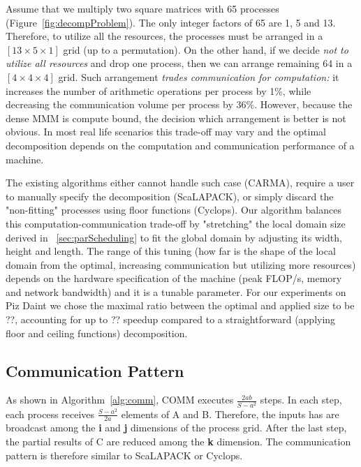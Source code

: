 \documentclass[sigplan,review,anonymous]{acmart}\settopmatter{printfolios=true,printccs=false,printacmref=false}
\begin{document}
Assume that we multiply two square matrices with 65 
processes (Figure~\ref{fig:decompProblem}). The only integer factors 
of 65 are 1, 5 and 13. Therefore, to 
utilize all the resources, the processes must be arranged in a $[13 
\times 5 \times 1]$ grid (up to a permutation). On the other hand, if 
we decide \emph{not to utilize all resources} 
and drop one process, then we can arrange remaining 64 in a $[4 
\times 4 \times 4]$ grid. Such arrangement \emph{trades communication 
	for computation:} it increases the number of arithmetic operations 
per process by 1\%, while decreasing the communication volume per 
process by 36\%. However, because the dense MMM is compute bound, the 
decision which arrangement is better is not obvious.
In most real life scenarios this trade-off may vary and the optimal 
decomposition depends on the computation and communication 
performance 
of a 
machine. 



The existing algorithms either cannot handle such case (CARMA), 
require a user to manually specify the decomposition (ScaLAPACK), or 
simply discard the "non-fitting" processes using floor functions 
(Cyclops). Our algorithm balances this computation-communication 
trade-off by "stretching" the local domain size 
derived in ~\cref{sec:parScheduling} to fit the global 
domain by adjusting its width, height and length. The range of this 
tuning (how far is the shape of the local domain from the optimal, 
increasing communication but utilizing more resources) 
depends on the hardware specification of the 
machine (peak FLOP/s, memory and network bandwidth) and it is a
tunable parameter. For our 
experiments on Piz Daint we chose the maximal ratio between the 
optimal and applied size to be ??, accounting for up to ?? speedup 
compared to a straightforward (applying floor and ceiling functions) 
decomposition.

\subsection{Communication Pattern}
\label{sec:commPattern}
As shown in Algorithm~\ref{alg:comm}, COMM executes $\frac{2ab}{S - a^2}$ 
steps. In each step, each process receives $\frac{S - a^2}{2a}$ elements of A 
and 
B. Therefore, the inputs has are broadcast among the \textbf{i} and \textbf{j} 
dimensions of the process grid. After the last step, the partial results of C 
are reduced among the \textbf{k} dimension. The communication pattern is 
therefore similar to ScaLAPACK or Cyclops.
\end{document}
